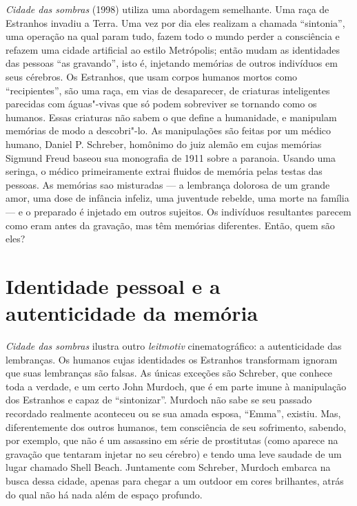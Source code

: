 \emph{Cidade das sombras} (1998) utiliza uma abordagem semelhante. Uma
raça de Estranhos invadiu a Terra. Uma vez por dia eles realizam a
chamada ``sintonia'', uma operação na qual param tudo, fazem todo o
mundo perder a consciência e refazem uma cidade artificial ao estilo
Metrópolis; então mudam as identidades das pessoas ``as gravando'', isto
é, injetando memórias de outros indivíduos em seus cérebros. Os
Estranhos, que usam corpos humanos mortos como ``recipientes'', são uma
raça, em vias de desaparecer, de criaturas inteligentes parecidas com
águas"-vivas que só podem sobreviver se tornando como os humanos. Essas
criaturas não sabem o que define a humanidade, e manipulam memórias de
modo a descobri"-lo. As manipulações são feitas por um médico humano,
Daniel P. Schreber, homônimo do juiz alemão em cujas memórias Sigmund
Freud baseou sua monografia de 1911 sobre a paranoia. Usando uma
seringa, o médico primeiramente extrai fluidos de memória pelas testas
das pessoas. As memórias sao misturadas --- a lembrança dolorosa de um
grande amor, uma dose de infância infeliz, uma juventude rebelde, uma
morte na família --- e o preparado é injetado em outros sujeitos. Os
indivíduos resultantes parecem como eram antes da gravação, mas têm
memórias diferentes. Então, quem são eles?

\chapter*{Identidade pessoal e a autenticidade da memória}

\emph{Cidade das sombras} ilustra outro \emph{leitmotiv}
cinematográfico: a autenticidade das lembranças. Os humanos cujas
identidades os Estranhos transformam ignoram que suas lembranças são
falsas. As únicas exceções são Schreber, que conhece toda a verdade, e
um certo John Murdoch, que é em parte imune à manipulação dos Estranhos
e capaz de ``sintonizar''. Murdoch não sabe se seu passado recordado
realmente aconteceu ou se sua amada esposa, ``Emma'', existiu. Mas,
diferentemente dos outros humanos, tem consciência de seu sofrimento,
sabendo, por exemplo, que não é um assassino em série de prostitutas
(como aparece na gravação que tentaram injetar no seu cérebro) e tendo
uma leve saudade de um lugar chamado Shell Beach. Juntamente com
Schreber, Murdoch embarca na busca dessa cidade, apenas para chegar a um
outdoor em cores brilhantes, atrás do qual não há nada além de espaço
profundo.

